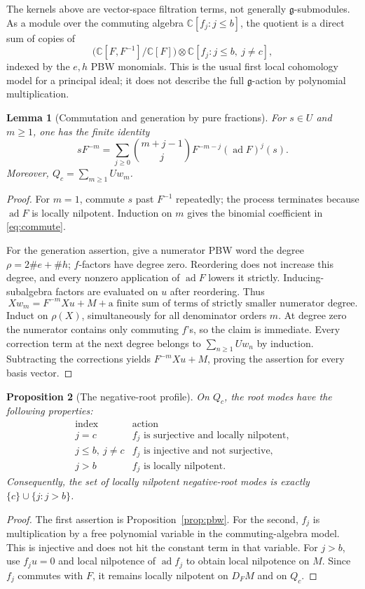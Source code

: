 \documentclass[11pt,a4paper]{article}
\newcommand{\C}{\mathbb C}
\newcommand{\g}{\mathfrak g}
\newcommand{\ad}{\operatorname{ad}}
\theoremstyle{plainupright}
\newtheorem{proposition}{Proposition}[section]
\newtheorem{lemma}[proposition]{Lemma}
\begin{document}
The kernels above are vector-space filtration terms, not generally
\(\g\)-submodules. As a module over the commuting algebra
\(\C[f_j:j\le b]\), the quotient is a direct sum of copies of
\[
\bigl(\C[F,F^{-1}]/\C[F]\bigr)
\otimes\C[f_j:j\le b,\ j\ne c],
\]
indexed by the \(e,h\) PBW monomials. This is the usual first local
cohomology model for a principal ideal; it does not describe the full
\(\g\)-action by polynomial multiplication.

\begin{lemma}[Commutation and generation by pure fractions]\label{lem:fractions}
For \(s\in U\) and \(m\ge1\), one has the finite identity
\begin{equation}\label{eq:commute}
sF^{-m}=\sum_{j\ge0}\binom{m+j-1}{j}F^{-m-j}(\ad F)^j(s).
\end{equation}
Moreover, \(Q_c=\sum_{m\ge1}Uw_m\).
\end{lemma}
\begin{proof}
For \(m=1\), commute \(s\) past \(F^{-1}\) repeatedly; the process terminates
because \(\ad F\) is locally nilpotent. Induction on \(m\) gives the
binomial coefficient in \eqref{eq:commute}.

For the generation assertion, give a numerator PBW word the degree
\(\rho=2\#e+\#h\); \(f\)-factors have degree zero. Reordering does not
increase this degree, and every nonzero application of \(\ad F\) lowers
it strictly. Inducing-subalgebra factors are evaluated on \(u\) after
reordering. Thus
\[
Xw_m=F^{-m}Xu+M+
  \text{a finite sum of terms of strictly smaller numerator degree}.
\]
Induct on \(\rho(X)\), simultaneously for all denominator orders \(m\).
At degree zero the numerator contains only commuting \(f\)'s, so the
claim is immediate. Every correction term at the next degree belongs to
\(\sum_{n\ge1}Uw_n\) by induction. Subtracting the corrections yields
\(F^{-m}Xu+M\), proving the assertion for every basis vector.
\end{proof}

\begin{proposition}[The negative-root profile]\label{prop:root}
On \(Q_c\), the root modes have the following properties:
\[
\begin{array}{c|l}
\text{index}&\text{action}\\ \hline
j=c&f_j\text{ is surjective and locally nilpotent},\\
j\le b,\ j\ne c&f_j\text{ is injective and not surjective},\\
j>b&f_j\text{ is locally nilpotent}.
\end{array}
\]
Consequently, the set of locally nilpotent negative-root modes is exactly
\(\{c\}\cup\{j:j>b\}\).
\end{proposition}
\begin{proof}
The first assertion is Proposition~\ref{prop:pbw}. For the second, \(f_j\)
is multiplication by a free polynomial variable in the commuting-algebra
model. This is injective and does not hit the constant term in that variable.
For \(j>b\), use \(f_ju=0\) and local nilpotence of \(\ad f_j\) to obtain
local nilpotence on \(M\). Since \(f_j\) commutes with \(F\), it remains
locally nilpotent on \(D_FM\) and on \(Q_c\).
\end{proof}
\end{document}
